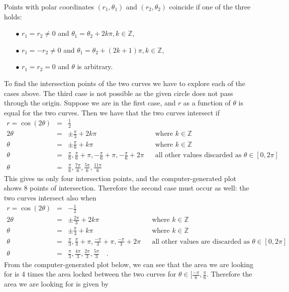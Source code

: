 {\begin{itemize}
Points with polar coordinates $(r_1, \theta_1) $ and $(r_2,\theta_2)$ coincide if one of the three holds:
\begin{itemize}
\item[$\bullet$] $r_1=r_2\neq 0$ and $\theta_1=\theta_2+2k\pi, k\in \mathbb Z $,
\item[$\bullet$] $r_1=-r_2\neq 0$ and $\theta_1=\theta_2+(2k+1)\pi, k\in \mathbb Z$,
\item[$\bullet$] $r_1=r_2=0 $ and $\theta$ is arbitrary.
\end{itemize}
To find the intersection points of the two curves we have to explore each of the cases above. The third case is not possible as the given circle does not pass through the origin. Suppose we are in the first case, and $r$ as a function of $\theta$ is equal for the two curves. Then we have that the two curves intersect if 
\[
\begin{array}{rcll|l}
r=\cos (2\theta)&=&\frac12\\
2\theta&=& \pm\frac{\pi}{3}+2k\pi&&\text{where }k\in \mathbb Z\\
\theta &=& \pm\frac{\pi}{6}+k\pi &&\text{where }k\in \mathbb Z\\
\theta &=& \frac{\pi}{6}, \frac{\pi}{6}+\pi, -\frac{\pi }{6}+\pi, -\frac{\pi }{6}+2\pi &&\text{all other values discarded as }\theta\in [0,2\pi]\\
\theta&=&\frac{\pi}{6}, \frac{7\pi}{6}, \frac{5\pi}{6}, \frac{11\pi}{6}
\end{array}
\]
This gives us only four intersection points, and the computer-generated plot shows 8 points of intersection. Therefore the second case must occur as well: the two curves intersect also when 
\[
\begin{array}{rcll|l}
r=\cos (2\theta)&=&-\frac{1}{2}\\
2\theta &=& \pm \frac{2\pi}{3} +2k\pi &&\text{where } k\in \mathbb Z\\
\theta &=& \pm \frac{\pi}{3} +k\pi &&\text{where } k\in \mathbb Z\\
\theta&=& \frac{\pi }{3}, \frac{\pi}{3}+\pi, \frac{-\pi}{3} +\pi, \frac{-\pi}{3}+2\pi &&\text{all other values are discarded as }\theta \in [0,2\pi]\\
\theta&=&\frac{\pi}{3}, \frac{4\pi}3, \frac{2\pi}{3}, \frac{5\pi}{3}  \quad .
\end{array}
\]
From the computer-generated plot below, we can see that the area we are looking for is 4 times the area locked between the two curves for $\theta\in [\frac{-\pi}{6}, \frac{\pi}{6} $. Therefore the area we are looking for is given by

\end{itemize}}
